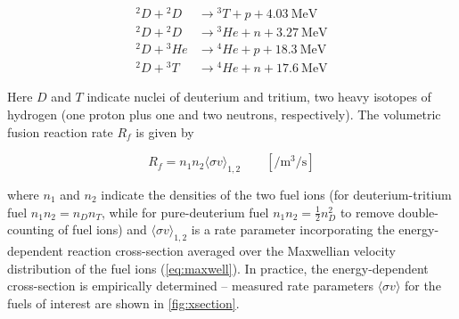 \begin{align}
 {}^2\si{D} + {}^2\si{D} &\rightarrow {}^3\si{T} + \si{p} + \SI{4.03}{\mega\electronvolt}\label{eq:dd1}\\
 {}^2\si{D} + {}^2\si{D} &\rightarrow {}^{3}\si{He} + \si{n} + \SI{3.27}{\mega\electronvolt}\label{eq:dd2}\\
 {}^2\si{D} + {}^3\si{He} &\rightarrow {}^4\si{He} + \si{p} + \SI{18.3}{\mega\electronvolt}\label{eq:dhe3}\\
  {}^2\si{D} + {}^3\si{T} &\rightarrow {}^4\si{He} + \si{n} + \SI{17.6}{\mega\electronvolt}\label{eq:dt}
\end{align}

\noindent Here $\si{D}$ and $\si{T}$ indicate nuclei of deuterium and tritium, two heavy isotopes of hydrogen (one proton plus one and two neutrons, respectively).  The volumetric fusion reaction rate $R_f$ is given by

\begin{equation}\label{eq:rate}
 R_f = n_1 n_2 \langle \sigma v \rangle_{1,2} \qquad [\si{\per\meter\cubed\per\second}]
\end{equation}

\noindent where $n_1$ and $n_2$ indicate the densities of the two fuel ions (\eg for deuterium-tritium fuel $n_1 n_2 = n_D n_T$, while for pure-deuterium fuel $n_1 n_2 = \frac{1}{2} n_D^2$ to remove double-counting of fuel ions) and $\langle \sigma v \rangle_{1,2}$ is a rate parameter incorporating the energy-dependent reaction cross-section averaged over the Maxwellian velocity distribution of the fuel ions (\cref{eq:maxwell}).  In practice, the energy-dependent cross-section is empirically determined -- measured rate parameters $\langle \sigma v \rangle$ for the fuels of interest are shown in \cref{fig:xsection}.

\begin{figure}
 \pushtooutside
\end{figure}

